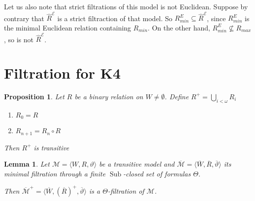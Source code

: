 \documentclass[a4paper]{article}
\theoremstyle{defin}
\theoremstyle{theorem}
\theoremstyle{prop}
\newtheorem{prop}{Proposition}
\theoremstyle{lemma}
\newtheorem{lemma}{Lemma}
\theoremstyle{ex}
\theoremstyle{col}
\begin{document}
Let us also note that strict filtrations of this model is not Euclidean.
Suppose by contrary that $\widehat{R}^{\mathcal{E}}$ is a strict filtraction of that model. So $R_{min}^E \subseteq \widehat{R}^{\mathcal{E}}$, since $R_{min}^E$ is the minimal Euclidean relation containing $R_{min}$. On the other hand, $R_{min}^E \not\subseteq R_{max}$, so is not $\widehat{R}^{\mathcal{E}}$.
\section{Filtration for {\bf K4}}

\begin{prop}
  Let $R$ be a binary relation on $W \neq \emptyset$. Define $R^{+} = \bigcup \limits_{i < \omega} R_i$
  \begin{enumerate}
    \item $R_0 = R$
    \item $R_{n + 1} = R_n \circ R$
  \end{enumerate}
  Then $R^{+}$ is transitive
\end{prop}

\begin{lemma}
  Let $\mathcal{M} = \langle W, R, \vartheta \rangle$ be a transitive model and $\overline{\mathcal{M}} = \langle \overline{W}, \overline{R}, \overline{\vartheta} \rangle$ its minimal filtration through a finite $\operatorname{Sub}$-closed set of formulas $\Theta$.

  Then $\overline{\mathcal{M}}^{+} = \langle \overline{W}, (\overline{R})^{+}, \overline{\vartheta} \rangle$ is a $\Theta$-filtration of $\mathcal{M}$.
\end{lemma}
\end{document}

